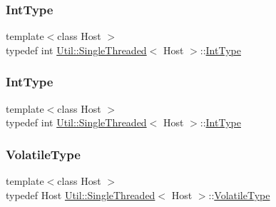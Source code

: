 \mbox{\label{classUtil_1_1SingleThreaded_a35932213fb0c15a7b67ced79bc2af4c6}} 
\subsubsection{\texorpdfstring{IntType}{IntType}\hspace{0.1cm}{\footnotesize\ttfamily [2/3]}}
{\footnotesize\ttfamily template$<$class Host $>$ \\
typedef int \mbox{\hyperlink{classUtil_1_1SingleThreaded}{Util\+::\+Single\+Threaded}}$<$ Host $>$\+::\mbox{\hyperlink{classUtil_1_1SingleThreaded_a35932213fb0c15a7b67ced79bc2af4c6}{Int\+Type}}}

\mbox{\label{classUtil_1_1SingleThreaded_a35932213fb0c15a7b67ced79bc2af4c6}} 
\subsubsection{\texorpdfstring{IntType}{IntType}\hspace{0.1cm}{\footnotesize\ttfamily [3/3]}}
{\footnotesize\ttfamily template$<$class Host $>$ \\
typedef int \mbox{\hyperlink{classUtil_1_1SingleThreaded}{Util\+::\+Single\+Threaded}}$<$ Host $>$\+::\mbox{\hyperlink{classUtil_1_1SingleThreaded_a35932213fb0c15a7b67ced79bc2af4c6}{Int\+Type}}}

\mbox{\label{classUtil_1_1SingleThreaded_a2181651ae6fb27288205435da7c5df22}} 
\subsubsection{\texorpdfstring{VolatileType}{VolatileType}\hspace{0.1cm}{\footnotesize\ttfamily [1/3]}}
{\footnotesize\ttfamily template$<$class Host $>$ \\
typedef Host \mbox{\hyperlink{classUtil_1_1SingleThreaded}{Util\+::\+Single\+Threaded}}$<$ Host $>$\+::\mbox{\hyperlink{classUtil_1_1SingleThreaded_a2181651ae6fb27288205435da7c5df22}{Volatile\+Type}}}

